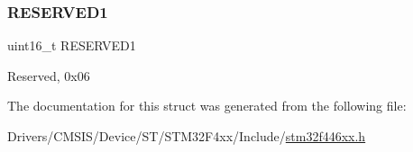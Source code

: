 \subsubsection{\texorpdfstring{R\+E\+S\+E\+R\+V\+E\+D1}{RESERVED1}}
{\footnotesize\ttfamily uint16\+\_\+t R\+E\+S\+E\+R\+V\+E\+D1}

Reserved, 0x06 

The documentation for this struct was generated from the following file\+:\begin{DoxyCompactItemize}
\item 
Drivers/\+C\+M\+S\+I\+S/\+Device/\+S\+T/\+S\+T\+M32\+F4xx/\+Include/\mbox{\hyperlink{stm32f446xx_8h}{stm32f446xx.\+h}}\end{DoxyCompactItemize}
